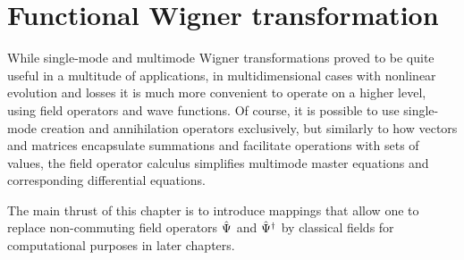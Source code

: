 \chapter{Functional Wigner transformation}
\label{cha:wigner}

While single-mode and multimode Wigner transformations proved to be quite useful in a multitude of applications, in multidimensional cases with nonlinear evolution and losses it is much more convenient to operate on a higher level, using field operators and wave functions.
Of course, it is possible to use single-mode creation and annihilation operators exclusively, but similarly to how vectors and matrices encapsulate summations and facilitate operations with sets of values, the field operator calculus simplifies multimode master equations and corresponding differential equations.

The main thrust of this chapter is to introduce mappings that allow one to replace non-commuting field operators $\hat{\Psi}$ and $\hat{\Psi}^\dagger$ by classical fields for computational purposes in later chapters.





